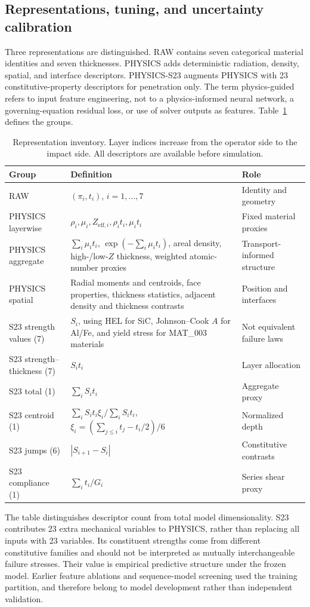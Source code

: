 \documentclass[12pt]{elsarticle}
\begin{document}
\subsection{Representations, tuning, and uncertainty calibration}
Three representations are distinguished. RAW contains seven categorical material identities and seven thicknesses. PHYSICS adds deterministic radiation, density, spatial, and interface descriptors. PHYSICS-S23 augments PHYSICS with 23 constitutive-property descriptors for penetration only. The term physics-guided refers to input feature engineering, not to a physics-informed neural network, a governing-equation residual loss, or use of solver outputs as features. Table~\ref{tab:features} defines the groups.
\begin{table}[H]\centering\small
\caption{Representation inventory. Layer indices increase from the operator side to the impact side. All descriptors are available before simulation.}\label{tab:features}
\begin{tabular}{@{}p{.24\linewidth}p{.47\linewidth}p{.21\linewidth}@{}}\toprule
Group & Definition & Role\\\midrule
RAW & $(\pi_i,t_i)$, $i=1,\ldots,7$ & Identity and geometry\\
PHYSICS layerwise & $\rho_i,\mu_i,Z_{\mathrm{eff},i},\rho_it_i,\mu_it_i$ & Fixed material proxies\\
PHYSICS aggregate & $\sum_i\mu_it_i$, $\exp(-\sum_i\mu_it_i)$, areal density, high-/low-$Z$ thickness, weighted atomic-number proxies & Transport-informed structure\\
PHYSICS spatial & Radial moments and centroids, face properties, thickness statistics, adjacent density and thickness contrasts & Position and interfaces\\
S23 strength values (7) & $S_i$, using HEL for SiC, Johnson--Cook $A$ for Al/Fe, and yield stress for MAT\_003 materials & Not equivalent failure laws\\
S23 strength--thickness (7) & $S_it_i$ & Layer allocation\\
S23 total (1) & $\sum_i S_it_i$ & Aggregate proxy\\
S23 centroid (1) & $\sum_i S_it_i\xi_i/\sum_i S_it_i$, $\xi_i=(\sum_{j\leq i}t_j-t_i/2)/6$ & Normalized depth\\
S23 jumps (6) & $|S_{i+1}-S_i|$ & Constitutive contrasts\\
S23 compliance (1) & $\sum_i t_i/G_i$ & Series shear proxy\\\bottomrule
\end{tabular}\end{table}
The table distinguishes descriptor count from total model dimensionality. S23 contributes 23 extra mechanical variables to PHYSICS, rather than replacing all inputs with 23 variables. Its constituent strengths come from different constitutive families and should not be interpreted as mutually interchangeable failure stresses. Their value is empirical predictive structure under the frozen model. Earlier feature ablations and sequence-model screening used the training partition, and therefore belong to model development rather than independent validation.
\end{document}
